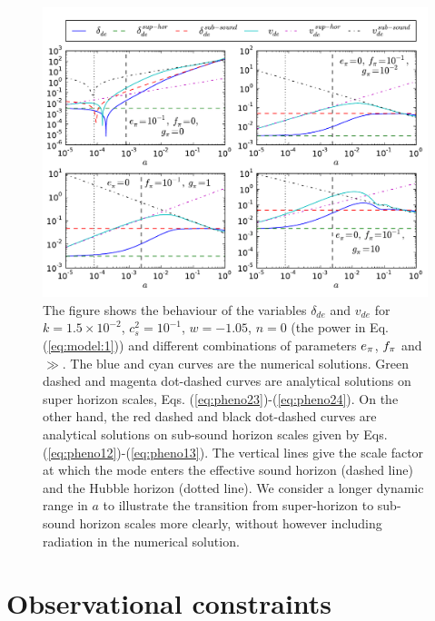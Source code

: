 \begin{figure}[tb]
\centering
\includegraphics[width=\textwidth]{figures/chapter-ade/comparison.pdf} 
\caption{The figure shows the behaviour of the variables $ \delta_{de} $ and $ v_{de} $ for $k=1.5\times 10^{-2}$, $c_s^2 = 10^{-1}$, $w=-1.05$, $ n=0 $ (the power in Eq. (\ref{eq:model:1})) and different combinations of parameters $\aa$, $\ff$ and $\gg$. The blue and cyan curves are the numerical solutions. Green dashed and magenta dot-dashed curves are analytical solutions on super horizon scales, Eqs. (\ref{eq:pheno23})-(\ref{eq:pheno24}). On the other hand, the red dashed and black dot-dashed curves are analytical solutions on sub-sound horizon scales given by Eqs. (\ref{eq:pheno12})-(\ref{eq:pheno13}). The vertical lines give the scale factor at which the mode enters the effective sound horizon (dashed line) and the Hubble horizon (dotted line). We consider  a longer dynamic range in $a$ to illustrate the transition from super-horizon to sub-sound horizon scales more clearly, without however including radiation in the numerical solution.}
\label{fig:comparison}
\end{figure}

\section{Observational constraints}
\label{chapter-ade:constraints}

